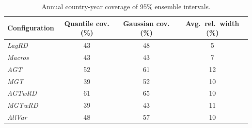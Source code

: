 \begin{table}[!htb]
\centering
\caption{Annual country-year coverage of 95\% ensemble intervals.}
\label{tab:cy_coverage}
\begin{tabular}{l c c c}
\toprule
Configuration & Quantile cov. (\%) & Gaussian cov. (\%) & Avg.\ rel.\ width (\%) \\
\midrule
\textit{LagRD} & 43 & 48 & 5 \\
\textit{Macros} & 43 & 43 & 7 \\
\textit{AGT} & 52 & 61 & 12 \\
\textit{MGT} & 39 & 52 & 10 \\
\textit{AGTwRD} & 61 & 65 & 10 \\
\textit{MGTwRD} & 39 & 43 & 11 \\
\textit{AllVar} & 48 & 57 & 10 \\
\bottomrule
\end{tabular}
\end{table}
